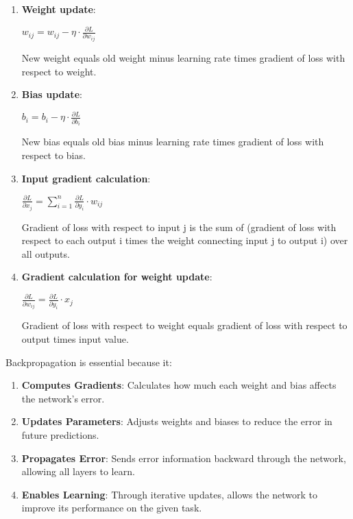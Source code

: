 \begin{enumerate}
\item {\bf Weight update}:

\vspace{3mm}
{\huge $w_{ij} = w_{ij} - \eta \cdot \frac{\partial L}{\partial w_{ij}}$}
\vspace{3mm}

New weight equals old weight minus learning rate times gradient of loss with
respect to weight.

\item {\bf Bias update}:

\vspace{3mm}
{\huge $b_i = b_i - \eta \cdot \frac{\partial L}{\partial b_i}$}
\vspace{3mm}

New bias equals old bias minus learning rate times gradient of loss with
respect to bias.

\item {\bf Input gradient calculation}:

\vspace{3mm}
{\huge $\frac{\partial L}{\partial x_j} = \sum_{i=1}^{n} \frac{\partial L}{\partial y_i} \cdot w_{ij}$}
\vspace{3mm}

Gradient of loss with respect to input j is the sum of (gradient of loss with
respect to each output i times the weight connecting input j to output i) over
all outputs.

\item {\bf Gradient calculation for weight update}:

\vspace{3mm}
{\huge $\frac{\partial L}{\partial w_{ij}} = \frac{\partial L}{\partial y_i} \cdot x_j$}
\vspace{3mm}

Gradient of loss with respect to weight equals gradient of loss with respect to
output times input value.
\end{enumerate}

Backpropagation is essential because it:

\begin{enumerate}
\item {\bf Computes Gradients}: Calculates how much each weight and bias affects
the network's error.

\item {\bf Updates Parameters}: Adjusts weights and biases to reduce the error in
future predictions.

\item {\bf Propagates Error}: Sends error information backward through the network,
allowing all layers to learn.

\item {\bf Enables Learning}: Through iterative updates, allows the network to
improve its performance on the given task.
\end{enumerate}

